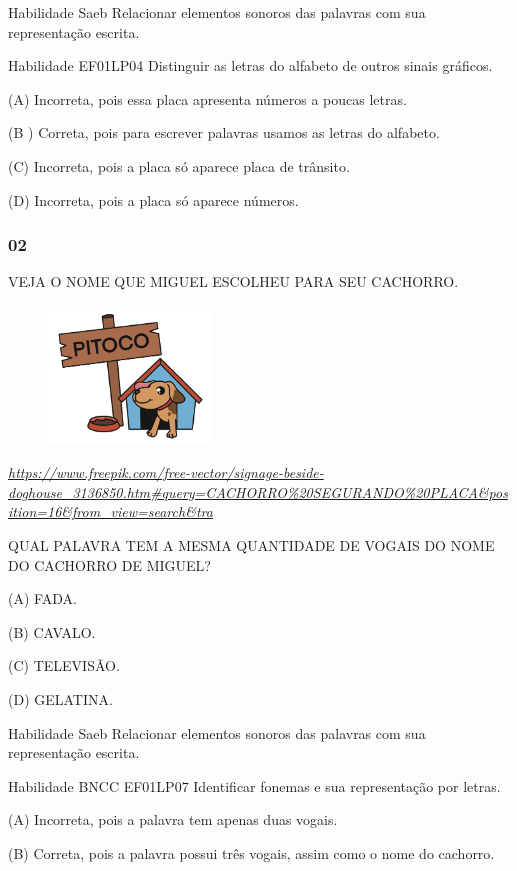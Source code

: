 \begin{escola}
Habilidade Saeb Relacionar elementos sonoros das palavras com sua
representação escrita.

Habilidade EF01LP04 Distinguir as letras do alfabeto de outros sinais
gráficos.

(A) Incorreta, pois essa placa apresenta números a poucas letras.

(B ) Correta, pois para escrever palavras usamos as letras do alfabeto.

(C) Incorreta, pois a placa só aparece placa de trânsito.

(D) Incorreta, pois a placa só aparece
números.\protect\hypertarget{_heading=h.vsxh2fkjtnnn}{}{}

\subsubsection{02}\label{section-58}

VEJA O NOME QUE MIGUEL ESCOLHEU PARA SEU CACHORRO.

\includegraphics[width=2.53194in,height=1.44514in]{media/image226.png}

\href{https://www.freepik.com/free-vector/signage-beside-doghouse_3136850.htm\#query=CACHORRO\%20SEGURANDO\%20PLACA\&position=16\&from_view=search\&tra}{\emph{https://www.freepik.com/free-vector/signage-beside-doghouse\_3136850.htm\#query=CACHORRO\%20SEGURANDO\%20PLACA\&position=16\&from\_view=search\&tra}}

QUAL PALAVRA TEM A MESMA QUANTIDADE DE VOGAIS DO NOME DO CACHORRO DE
MIGUEL?

(A) FADA.

(B) CAVALO.

(C) TELEVISÃO.

(D) GELATINA.

Habilidade Saeb Relacionar elementos sonoros das palavras com sua
representação escrita.

Habilidade BNCC EF01LP07 Identificar fonemas e sua representação por
letras.

(A) Incorreta, pois a palavra tem apenas duas vogais.

(B) Correta, pois a palavra possui três vogais, assim como o nome do
cachorro.


\end{escola}
